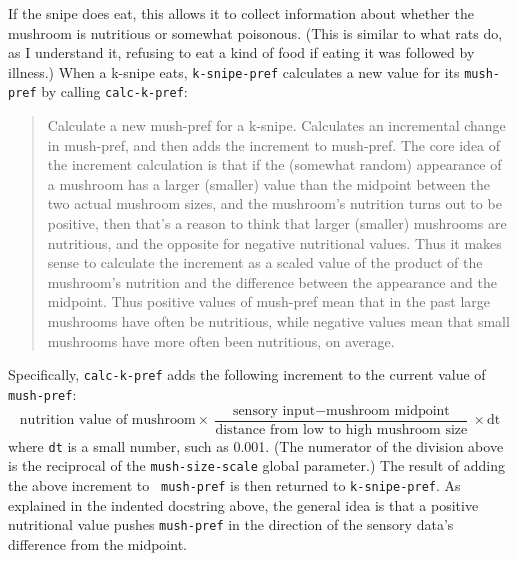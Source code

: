\documentclass[12pt]{article}
\begin{document}
If the snipe does eat, this allows it to collect information about
whether the mushroom is nutritious or somewhat poisonous.  (This is
similar to what rats do, as I understand it, refusing to eat a kind of
food if eating it was followed by illness.)  When a k-snipe eats, 
{\tt k-snipe-pref} calculates a new value for its {\tt mush-pref} by
calling {\tt calc-k-pref}:
\begin{quote}\vspace{-2ex}
    Calculate a new mush-pref for a k-snipe.  Calculates an
    incremental change in mush-pref, and then adds the increment to
    mush-pref.  The core idea of the  increment calculation is that if
    the (somewhat random) appearance of a mushroom has a larger
    (smaller) value than the midpoint between the two actual mushroom
    sizes, and the mushroom's nutrition turns out to be positive, then
    that's a reason to think that larger (smaller) mushrooms are
    nutritious, and the opposite for negative nutritional values. 
    Thus it makes sense to calculate the increment as a scaled value
    of the product of the mushroom's  nutrition and the difference
    between the appearance and the midpoint.  Thus positive values of
    mush-pref mean that in the past large mushrooms have often be
    nutritious, while negative values mean that small mushrooms have
    more often been nutritious, on average.
\end{quote}\vspace{-2ex}
Specifically, {\tt calc-k-pref} adds the following increment to the
current value of {\tt mush-pref}:
\[
    \mbox{nutrition value of mushroom} \times  \frac{\mbox{sensory
    input} - \mbox{mushroom midpoint}}{\mbox{distance from low to high
    mushroom size}} \times \mbox{dt}
\]
where {\tt dt} is a small number, such as 0.001.  (The numerator of
the division above is the reciprocal of the {\tt mush-size-scale}
global parameter.)  The result of adding the above increment to {\tt
mush-pref} is then returned to {\tt k-snipe-pref}.  As explained in
the indented docstring above, the general  idea is that a positive
nutritional value pushes {\tt mush-pref} in the direction of the
sensory data's difference from the midpoint.
\end{document}
